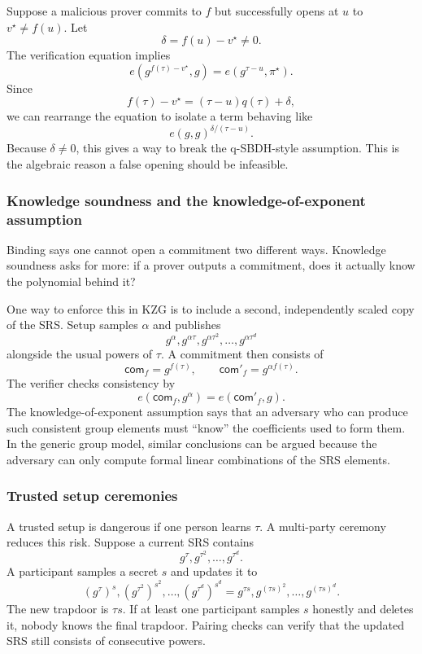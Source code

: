 Suppose a malicious prover commits to $f$ but successfully opens at $u$ to $v^\star\neq f(u)$. Let
\[
    \delta=f(u)-v^\star\neq 0.
\]
The verification equation implies
\[
    e(g^{f(\tau)-v^\star},g)=e(g^{\tau-u},\pi^\star).
\]
Since
\[
    f(\tau)-v^\star=(\tau-u)q(\tau)+\delta,
\]
we can rearrange the equation to isolate a term behaving like
\[
    e(g,g)^{\delta/(\tau-u)}.
\]
Because $\delta\neq 0$, this gives a way to break the q-SBDH-style assumption. This is the algebraic reason a false opening should be infeasible.

\subsubsection{Knowledge soundness and the knowledge-of-exponent assumption}

Binding says one cannot open a commitment two different ways. Knowledge soundness asks for more: if a prover outputs a commitment, does it actually know the polynomial behind it?

One way to enforce this in KZG is to include a second, independently scaled copy of the SRS. Setup samples $\alpha$ and publishes
\[
    g^\alpha,g^{\alpha\tau},g^{\alpha\tau^2},\ldots,g^{\alpha\tau^d}
\]
alongside the usual powers of $\tau$. A commitment then consists of
\[
    \mathsf{com}_f=g^{f(\tau)},
    \qquad
    \mathsf{com}'_f=g^{\alpha f(\tau)}.
\]
The verifier checks consistency by
\[
    e(\mathsf{com}_f,g^\alpha)=e(\mathsf{com}'_f,g).
\]
The knowledge-of-exponent assumption says that an adversary who can produce such consistent group elements must ``know'' the coefficients used to form them. In the generic group model, similar conclusions can be argued because the adversary can only compute formal linear combinations of the SRS elements.

\subsubsection{Trusted setup ceremonies}

A trusted setup is dangerous if one person learns $\tau$. A multi-party ceremony reduces this risk. Suppose a current SRS contains
\[
    g^\tau,g^{\tau^2},\ldots,g^{\tau^d}.
\]
A participant samples a secret $s$ and updates it to
\[
    (g^\tau)^s,
    (g^{\tau^2})^{s^2},
    \ldots,
    (g^{\tau^d})^{s^d}
    =g^{\tau s},g^{(\tau s)^2},\ldots,g^{(\tau s)^d}.
\]
The new trapdoor is $\tau s$. If at least one participant samples $s$ honestly and deletes it, nobody knows the final trapdoor. Pairing checks can verify that the updated SRS still consists of consecutive powers.


